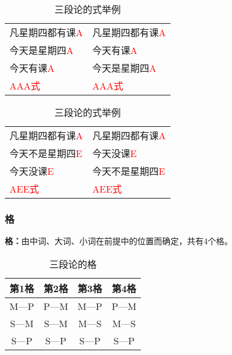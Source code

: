 \documentclass[12pt,onecolumn,a4paper]{book}
\numberwithin{table}{subsection}
\numberwithin{equation}{subsection}
\begin{document}
\begin{table}[h]
\begin{center}
\begin{tabular}{l|l}
凡星期四都有课\textcolor{red}{A} &凡星期四都有课\textcolor{red}{A}\\
今天是星期四\textcolor{red}{A}   &  今天有课\textcolor{red}{A}\\
\hdashline
今天有课\textcolor{red}{A}  &   今天是星期四\textcolor{red}{A}\\
\hline
\textcolor{red}{AAA式}&\textcolor{red}{AAA式}\\
\end{tabular}
\par
\begin{tabular}{l|l}
凡星期四都有课\textcolor{red}{A}  &  凡星期四都有课\textcolor{red}{A}\\
今天不是星期四\textcolor{red}{E}   &    今天没课\textcolor{red}{E}\\
\hdashline
今天没课\textcolor{red}{E}  & 今天不是星期四\textcolor{red}{E}  \\
\hline
\textcolor{red}{AEE式}&\textcolor{red}{AEE式}\\
\end{tabular}
\caption{三段论的式举例}
\end{center}
\end{table}

\subsubsection{格}
\textbf{格：}由中词、大词、小词在前提中的位置而确定，共有4个格。

\begin{table}[h]
\begin{center}
    \begin{tabular}{c|c|c|c}
        第1格&第2格&第3格&第4格\\
        \hline
        M—P&P—M&M—P&P—M\\
        S—M&S—M&M—S&M—S\\
        \hdashline
        S—P&S—P&S—P&S—P\\
    \end{tabular}
    \caption{三段论的格}
\end{center}
\end{table}
\end{document}
